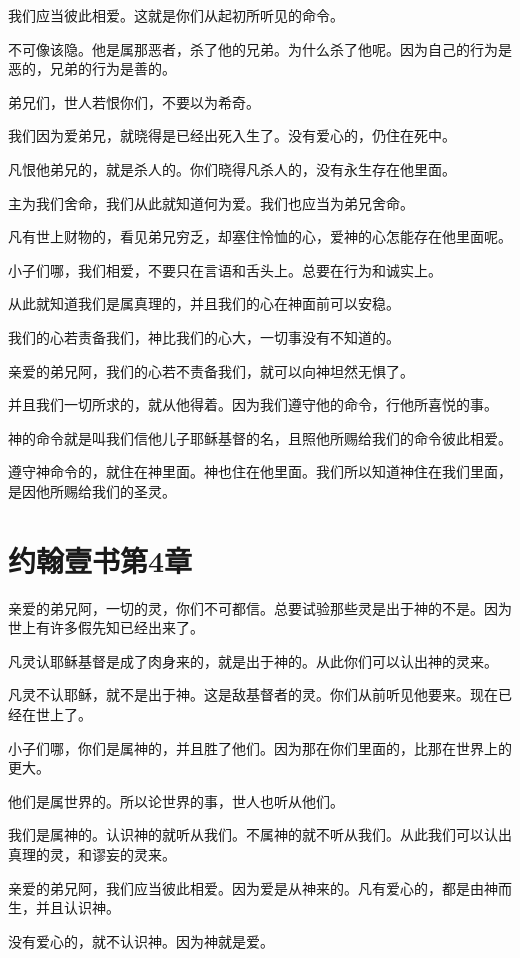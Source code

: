 \documentclass[12pt,oneside]{book}
\begin{document}
我们应当彼此相爱。这就是你们从起初所听见的命令。

不可像该隐。他是属那恶者，杀了他的兄弟。为什么杀了他呢。因为自己的行为是恶的，兄弟的行为是善的。

弟兄们，世人若恨你们，不要以为希奇。

我们因为爱弟兄，就晓得是已经出死入生了。没有爱心的，仍住在死中。

凡恨他弟兄的，就是杀人的。你们晓得凡杀人的，没有永生存在他里面。

主为我们舍命，我们从此就知道何为爱。我们也应当为弟兄舍命。

凡有世上财物的，看见弟兄穷乏，却塞住怜恤的心，爱神的心怎能存在他里面呢。

小子们哪，我们相爱，不要只在言语和舌头上。总要在行为和诚实上。

从此就知道我们是属真理的，并且我们的心在神面前可以安稳。

我们的心若责备我们，神比我们的心大，一切事没有不知道的。

亲爱的弟兄阿，我们的心若不责备我们，就可以向神坦然无惧了。

并且我们一切所求的，就从他得着。因为我们遵守他的命令，行他所喜悦的事。

神的命令就是叫我们信他儿子耶稣基督的名，且照他所赐给我们的命令彼此相爱。

遵守神命令的，就住在神里面。神也住在他里面。我们所以知道神住在我们里面，是因他所赐给我们的圣灵。

\chapter{约翰壹书第4章}
亲爱的弟兄阿，一切的灵，你们不可都信。总要试验那些灵是出于神的不是。因为世上有许多假先知已经出来了。

凡灵认耶稣基督是成了肉身来的，就是出于神的。从此你们可以认出神的灵来。

凡灵不认耶稣，就不是出于神。这是敌基督者的灵。你们从前听见他要来。现在已经在世上了。

小子们哪，你们是属神的，并且胜了他们。因为那在你们里面的，比那在世界上的更大。

他们是属世界的。所以论世界的事，世人也听从他们。

我们是属神的。认识神的就听从我们。不属神的就不听从我们。从此我们可以认出真理的灵，和谬妄的灵来。

亲爱的弟兄阿，我们应当彼此相爱。因为爱是从神来的。凡有爱心的，都是由神而生，并且认识神。

没有爱心的，就不认识神。因为神就是爱。
\end{document}

